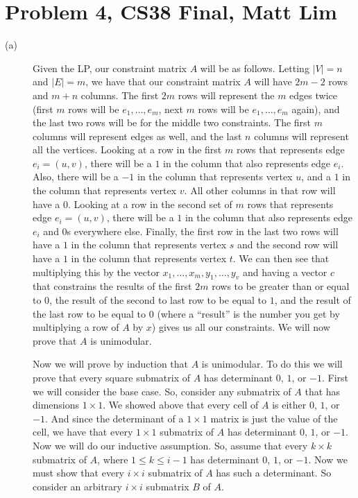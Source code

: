 \documentclass{article}
\begin{document}
\section*{Problem 4, CS38 Final, Matt Lim}
\begin{description}
    \item[(a)] Given the LP, our constraint matrix $A$ will be as follows. Letting
        $|V| = n$ and $|E| = m$, we have that our constraint matrix $A$ will
        have $2m - 2$ rows and $m + n$ columns. The first $2m$ rows will represent the $m$
        edges twice (first $m$ rows will be $e_1, \dots, e_m$, next $m$ rows
        will be $e_1, \dots, e_m$ again), and the last two rows will be for the middle two
        constraints. The first $m$ columns will represent edges as well, and the
        last $n$ columns will represent all the vertices. Looking at a
        row in the first $m$ rows that represents edge $e_i = (u,v)$, there will be a $1$ in the
        column that also represents edge $e_i$. Also, there will be a $-1$ in
        the column that represents vertex $u$, and a $1$ in the column that
        represents vertex $v$. All other columns in that row will have a $0$.
        Looking at a row in the second set of $m$ rows that
        represents edge $e_i = (u,v)$, there will be a $1$ in the
        column that also represents edge $e_i$ and $0$s everywhere else.
        Finally, the first row in the last two rows will have a $1$ in the column that
        represents vertex $s$ and the second row will have a $1$ in the column
        that represents vertex $t$. We can then see that multiplying this by the
        vector $x_1, \dots, x_m, y_1, \dots, y_v$ and having a vector $c$ that
        constrains the results of the first $2m$ rows to be greater than or
        equal to $0$, the result of the second to last row to be equal to $1$,
        and the result of the last row to be equal to $0$ (where a ``result'' is the
        number you get by multiplying a row of $A$ by $x$) gives us all our
        constraints. We will now prove that $A$ is unimodular.

        Now we will prove by induction that $A$ is unimodular. To do this we
        will prove that every square submatrix of $A$ has determinant $0$, $1$,
        or $-1$.
        First we will consider the base case. So, consider any submatrix of $A$
        that has dimensions $1 \times 1$. We showed above that every cell of $A$
        is either $0$, $1$, or $-1$. And since the determinant of a $1 \times 1$
        matrix is just the value of the cell, we have that every $1 \times 1$
        submatrix of $A$ has determinant $0$, $1$, or $-1$. Now we will do our inductive
        assumption. So, assume that every $k \times k$ submatrix of
        $A$, where $1 \le k \le i - 1$ has determinant $0$, $1$, or $-1$.
        Now we must show that every $i \times i$ submatrix of
        $A$ has such a determinant. So consider an arbitrary $i \times i$
        submatrix $B$ of $A$.


\end{description}
\end{document}
